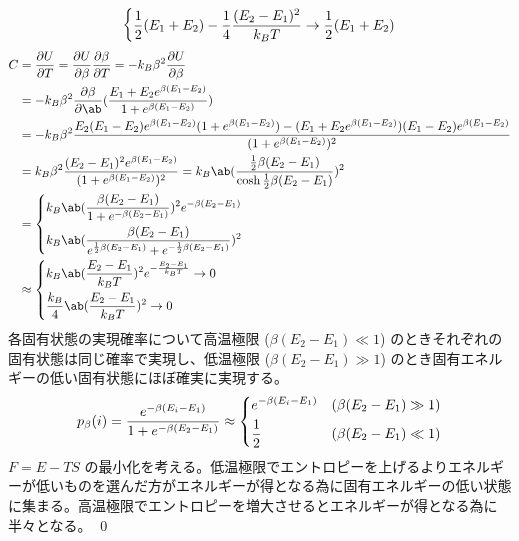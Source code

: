 \documentclass[uplatex,diffipdfmx,a4paper,11pt]{jlreq}
\makeatletter
\numberwithin{equation}{section}
\theoremstyle{definition}
\renewenvironment{proof}[1][\proofname]{\par
  \normalfont
  \topsep6\p@\@plus6\p@ \trivlist
  \item[\hskip\labelsep{\bfseries #1}\@addpunct{\bfseries}]\ignorespaces\quad\par
}{%
  \qed\endtrivlist\@endpefalse
}
\renewcommand\proofname{証明}
\makeatother
\begin{document}
\begin{proof}
\begin{align}
\begin{dcases}
                  \frac{1}{2}(E_1 + E_2) - \frac{1}{4}\frac{(E_2 - E_1)^2}{k_BT} \to \frac{1}{2}(E_1 + E_2) \\
                \end{dcases}
  \end{align}
  \begin{align}
    C & = \diffp{U}{T} = \diffp{U}{\beta}\diffp{\beta}{T} = -k_B\beta^2\diffp{U}{\beta}                                                                                                 \\
      & = -k_B\beta^2\diffp{\beta}\ab(\frac{E_1 + E_2e^{\beta(E_1 - E_2)}}{1 + e^{\beta(E_1 - E_2)}})                                                                                   \\
      & = -k_B\beta^2\frac{E_2(E_1 - E_2)e^{\beta(E_1 - E_2)}(1 + e^{\beta(E_1 - E_2)}) - (E_1 + E_2e^{\beta(E_1 - E_2)})(E_1 - E_2)e^{\beta(E_1 - E_2)}}{(1 + e^{\beta(E_1 - E_2)})^2} \\
      & = k_B\beta^2\frac{(E_2 - E_1)^2e^{\beta(E_1 - E_2)}}{(1 + e^{\beta(E_1 - E_2)})^2} = k_B\ab(\frac{\frac{1}{2}\beta(E_2 - E_1)}{\cosh\frac{1}{2}\beta(E_2 - E_1)})^2             \\
      & = \begin{dcases}
            k_B\ab(\frac{\beta(E_2 - E_1)}{1 + e^{-\beta(E_2 - E_1)}})^2e^{-\beta(E_2 - E_1)} \\
            k_B\ab(\frac{\beta(E_2 - E_1)}{e^{\frac{1}{2}\beta(E_2 - E_1)} + e^{-\frac{1}{2}\beta(E_2 - E_1)}})^2
          \end{dcases}                                                          \\
      & \approx \begin{dcases}
                  k_B\ab(\frac{E_2 - E_1}{k_BT})^2e^{-\frac{E_2 - E_1}{k_BT}} \to 0 \\
                  \frac{k_B}{4}\ab(\frac{E_2 - E_1}{k_BT})^2 \to 0
                \end{dcases}
  \end{align}
  各固有状態の実現確率について高温極限 ($\beta(E_2 - E_1) \ll 1$) のときそれぞれの固有状態は同じ確率で実現し、低温極限 ($\beta(E_2 - E_1) \gg 1$) のとき固有エネルギーの低い固有状態にほぼ確実に実現する。
  \begin{align}
    \quad p_\beta(i) & = \frac{e^{-\beta (E_i - E_1)}}{1 + e^{-\beta(E_2 - E_1)}} \approx \begin{dcases}
                                                                                            e^{-\beta (E_i - E_1)} & (\beta(E_2 - E_1) \gg 1) \\
                                                                                            \frac{1}{2}            & (\beta(E_2 - E_1) \ll 1)
                                                                                          \end{dcases}
  \end{align}
  $F = E - TS$ の最小化を考える。低温極限でエントロピーを上げるよりエネルギーが低いものを選んだ方がエネルギーが得となる為に固有エネルギーの低い状態に集まる。高温極限でエントロピーを増大させるとエネルギーが得となる為に半々となる。
\end{proof}
\end{document}
